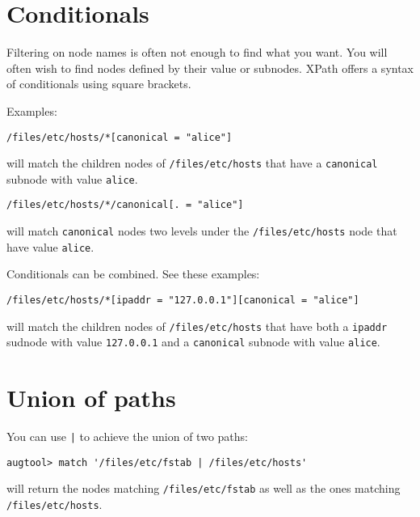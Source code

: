 \section{Conditionals}

Filtering on node names is often not enough to find what you want. You will often wish to find nodes defined by their value or subnodes. XPath offers a syntax of conditionals using square brackets.

Examples:

\begin{verbatim}
/files/etc/hosts/*[canonical = "alice"]
\end{verbatim}
will match the children nodes of \nolinkurl{/files/etc/hosts} that have a \verb!canonical! subnode with value \verb!alice!.

\begin{verbatim}
/files/etc/hosts/*/canonical[. = "alice"]
\end{verbatim}
will match \verb!canonical! nodes two levels under the \nolinkurl{/files/etc/hosts} node that have value \verb!alice!.

\begin{quote}

\end{quote}
Conditionals can be combined. See these examples:

\begin{verbatim}
/files/etc/hosts/*[ipaddr = "127.0.0.1"][canonical = "alice"]
\end{verbatim}
will match the children nodes of \nolinkurl{/files/etc/hosts} that have both a \verb!ipaddr! sudnode with value \verb!127.0.0.1! and a \verb!canonical! subnode with value \verb!alice!.

\section{Union of paths}

You can use \verb!|! to achieve the union of two paths:

\begin{verbatim}
augtool> match '/files/etc/fstab | /files/etc/hosts'
\end{verbatim}
will return the nodes matching \nolinkurl{/files/etc/fstab} as well as the ones matching \nolinkurl{/files/etc/hosts}.

